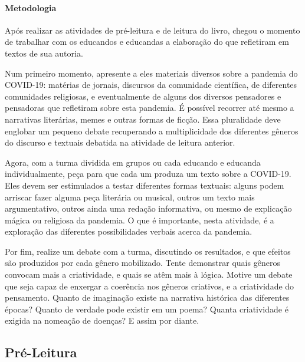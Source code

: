 \documentclass[12pt]{extarticle}
\begin{document}
\paragraph{Metodologia}

Após realizar as atividades de pré-leitura e de leitura do livro, chegou
o momento de trabalhar com os educandos e educandas a elaboração do que
refletiram em textos de sua autoria.

Num primeiro momento, apresente a eles materiais diversos sobre a
pandemia do COVID-19: matérias de jornais, discursos da comunidade
científica, de diferentes comunidades religiosas, e eventualmente de
alguns dos diversos pensadores e pensadoras que refletiram sobre esta
pandemia. É possível recorrer até mesmo a narrativas literárias, memes e
outras formas de ficção. Essa pluralidade deve englobar um pequeno
debate recuperando a multiplicidade dos diferentes gêneros do discurso e
textuais debatida na atividade de leitura anterior.

Agora, com a turma dividida em grupos ou cada educando e educanda
individualmente, peça para que cada um produza um texto sobre a
COVID-19. Eles devem ser estimulados a testar diferentes formas
textuais: alguns podem arriscar fazer alguma peça literária ou musical,
outros um texto mais argumentativo, outros ainda uma redação
informativa, ou mesmo de explicação mágica ou religiosa da pandemia. O
que é importante, nesta atividade, é a exploração das diferentes
possibilidades verbais acerca da pandemia.

Por fim, realize um debate com a turma, discutindo os resultados, e que
efeitos são produzidos por cada gênero mobilizado. Tente demonstrar
quais gêneros convocam mais a criatividade, e quais se atêm mais à
lógica. Motive um debate que seja capaz de enxergar a coerência nos
gêneros criativos, e a criatividade do pensamento. Quanto de imaginação
existe na narrativa histórica das diferentes épocas? Quanto de verdade
pode existir em um poema? Quanta criatividade é exigida na nomeação de
doenças? E assim por diante.


\subsection{Pré-Leitura}

\end{document}
